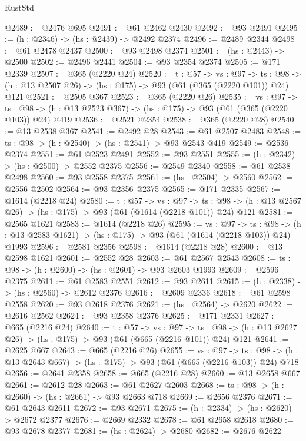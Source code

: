 \begin{lexlean}{RustStd}
\begin{coremodule}
@2489 := @2476 @695
@2491 := @61 @2462 @2430
@2492 := @93 @2491
@2495 := (h : @2346) -> (hs : @2439) -> @2492 @2374
@2496 := @2489 @2344
@2498 := @61 @2478 @2437
@2500 := @93 @2498 @2374
@2501 := (hs : @2443) -> @2500
@2502 := @2496 @2441
@2504 := @93 @2354 @2374
@2505 := @171 @2339
@2507 := @365 (@2220 @24)
@2520 := {t : @57} ->
  {vs : @97} ->
  {ts : @98} -> (h : @13 @2507 @26) -> (hs : @175) -> @93 (@61 (@365 (@2220 @101)) @24) @121
@2521 := @2505 @367
@2523 := @365 (@2220 @26)
@2535 := {vs : @97} ->
  {ts : @98} -> (h : @13 @2523 @367) -> (hs : @175) -> @93 (@61 (@365 (@2220 @103)) @24) @419
@2536 := @2521 @2354
@2538 := @365 (@2220 @28)
@2540 := @13 @2538 @367
@2541 := @2492 @28
@2543 := @61 @2507 @2483
@2548 := {ts : @98} -> (h : @2540) -> (hs : @2541) -> @93 @2543 @419
@2549 := @2536 @2374
@2551 := @61 @2523 @2491
@2552 := @93 @2551
@2555 := (h : @2342) -> (hs : @2500) -> @2552 @2375
@2556 := @2549 @2340
@2558 := @61 @2538 @2498
@2560 := @93 @2558 @2375
@2561 := (hs : @2504) -> @2560
@2562 := @2556 @2502
@2564 := @93 @2356 @2375
@2565 := @171 @2335
@2567 := @1614 (@2218 @24)
@2580 := {t : @57} ->
  {vs : @97} ->
  {ts : @98} -> (h : @13 @2567 @26) -> (hs : @175) -> @93 (@61 (@1614 (@2218 @101)) @24) @121
@2581 := @2565 @1621
@2583 := @1614 (@2218 @26)
@2595 := {vs : @97} ->
  {ts : @98} -> (h : @13 @2583 @1621) -> (hs : @175) -> @93 (@61 (@1614 (@2218 @103)) @24) @1993
@2596 := @2581 @2356
@2598 := @1614 (@2218 @28)
@2600 := @13 @2598 @1621
@2601 := @2552 @28
@2603 := @61 @2567 @2543
@2608 := {ts : @98} -> (h : @2600) -> (hs : @2601) -> @93 @2603 @1993
@2609 := @2596 @2375
@2611 := @61 @2583 @2551
@2612 := @93 @2611
@2615 := (h : @2338) -> (hs : @2560) -> @2612 @2376
@2616 := @2609 @2336
@2618 := @61 @2598 @2558
@2620 := @93 @2618 @2376
@2621 := (hs : @2564) -> @2620
@2622 := @2616 @2562
@2624 := @93 @2358 @2376
@2625 := @171 @2331
@2627 := @665 (@2216 @24)
@2640 := {t : @57} ->
  {vs : @97} ->
  {ts : @98} -> (h : @13 @2627 @26) -> (hs : @175) -> @93 (@61 (@665 (@2216 @101)) @24) @121
@2641 := @2625 @667
@2643 := @665 (@2216 @26)
@2655 := {vs : @97} ->
  {ts : @98} -> (h : @13 @2643 @667) -> (hs : @175) -> @93 (@61 (@665 (@2216 @103)) @24) @718
@2656 := @2641 @2358
@2658 := @665 (@2216 @28)
@2660 := @13 @2658 @667
@2661 := @2612 @28
@2663 := @61 @2627 @2603
@2668 := {ts : @98} -> (h : @2660) -> (hs : @2661) -> @93 @2663 @718
@2669 := @2656 @2376
@2671 := @61 @2643 @2611
@2672 := @93 @2671
@2675 := (h : @2334) -> (hs : @2620) -> @2672 @2377
@2676 := @2669 @2332
@2678 := @61 @2658 @2618
@2680 := @93 @2678 @2377
@2681 := (hs : @2624) -> @2680
@2682 := @2676 @2622

\end{coremodule}
\end{lexlean}
